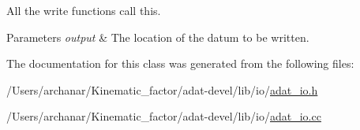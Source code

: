 All the write functions call this. 
\begin{DoxyParams}{Parameters}
{\em output} & The location of the datum to be written. \\
\hline
\end{DoxyParams}


The documentation for this class was generated from the following files\+:\begin{DoxyCompactItemize}
\item 
/\+Users/archanar/\+Kinematic\+\_\+factor/adat-\/devel/lib/io/\mbox{\hyperlink{adat-devel_2lib_2io_2adat__io_8h}{adat\+\_\+io.\+h}}\item 
/\+Users/archanar/\+Kinematic\+\_\+factor/adat-\/devel/lib/io/\mbox{\hyperlink{adat-devel_2lib_2io_2adat__io_8cc}{adat\+\_\+io.\+cc}}\end{DoxyCompactItemize}
